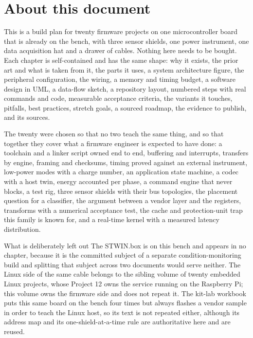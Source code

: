 \section*{About this document}

This is a build plan for twenty firmware projects on one microcontroller board that is already on the bench, with three sensor shields, one power instrument, one data acquisition hat and a drawer of cables. Nothing here needs to be bought. Each chapter is self-contained and has the same shape: why it exists, the prior art and what is taken from it, the parts it uses, a system architecture figure, the peripheral configuration, the wiring, a memory and timing budget, a software design in UML, a data-flow sketch, a repository layout, numbered steps with real commands and code, measurable acceptance criteria, the variants it touches, pitfalls, best practices, stretch goals, a sourced roadmap, the evidence to publish, and its sources.

The twenty were chosen so that no two teach the same thing, and so that together they cover what a firmware engineer is expected to have done: a toolchain and a linker script owned end to end, buffering and interrupts, transfers by engine, framing and checksums, timing proved against an external instrument, low-power modes with a charge number, an application state machine, a codec with a host twin, energy accounted per phase, a command engine that never blocks, a test rig, three sensor shields with their bus topologies, the placement question for a classifier, the argument between a vendor layer and the registers, transforms with a numerical acceptance test, the cache and protection-unit trap this family is known for, and a real-time kernel with a measured latency distribution.

\begin{note}{What is deliberately left out}
The STWIN.box is on this bench and appears in no chapter, because it is the committed subject of a separate condition-monitoring build and splitting that subject across two documents would serve neither. The Linux side of the same cable belongs to the sibling volume of twenty embedded Linux projects, whose Project 12 owns the service running on the Raspberry Pi; this volume owns the firmware side and does not repeat it. The kit-lab workbook puts this same board on the bench four times but always flashes a vendor sample in order to teach the Linux host, so its text is not repeated either, although its address map and its one-shield-at-a-time rule are authoritative here and are reused.
\end{note}

